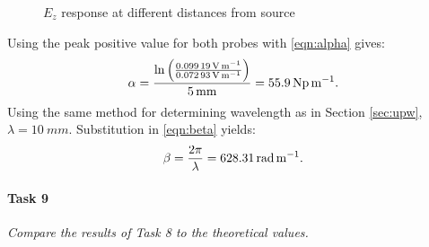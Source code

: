 \begin{figure}[tbph]
	\centering
	\caption{$E_z$ response at different distances from source}
	\label{fig:Task3-probes}
\end{figure}

Using the peak positive value for both probes with \eqref{eqn:alpha} gives:
\begin{equation*}
	\alpha = { \ln \left( { \SI{0.09919}{\volt\per\meter} \over \SI{0.07293}{\volt\per\meter} } \right) \over \SI{5}{\milli\meter}} = \SI{55.9}{\neper\per\meter}.
\end{equation*}
Using the same method for determining wavelength as in Section \ref{sec:upw}, $\lambda = \SI{10}{mm}$.
Substitution in \eqref{eqn:beta} yields:
\begin{equation*}
	\beta = {2 \pi \over \lambda} = \SI{628.31}{\radian\per\meter}.
\end{equation*}
\newpage
\paragraph{Task 9} \textit{Compare the results of Task 8 to the theoretical values.}


